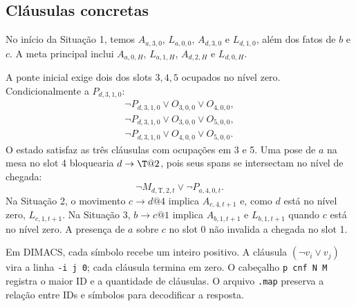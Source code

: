 \documentclass[11pt,a4paper]{article}
\newcommand{\T}{\mathrm{T}}
\begin{document}
\subsection{Cláusulas concretas}
No início da Situação 1, temos $A_{a,3,0}$, $L_{a,0,0}$, $A_{d,3,0}$ e $L_{d,1,0}$, além dos fatos de $b$ e $c$. A meta principal inclui $A_{a,0,H}$, $L_{a,1,H}$, $A_{d,2,H}$ e $L_{d,0,H}$.

A ponte inicial exige dois dos slots $3,4,5$ ocupados no nível zero. Condicionalmente a $P_{d,3,1,0}$:
\begin{gather*}
\neg P_{d,3,1,0}\lor O_{3,0,0}\lor O_{4,0,0},\\
\neg P_{d,3,1,0}\lor O_{3,0,0}\lor O_{5,0,0},\\
\neg P_{d,3,1,0}\lor O_{4,0,0}\lor O_{5,0,0}.
\end{gather*}
O estado satisfaz as três cláusulas com ocupações em 3 e 5. Uma pose de $a$ na mesa no slot 4 bloquearia $d\to\T@2$, pois seus spans se intersectam no nível de chegada:
\[
\neg M_{d,\T,2,t}\lor\neg P_{a,4,0,t}.
\]
Na Situação 2, o movimento $c\to d@4$ implica $A_{c,4,t+1}$ e, como $d$ está no nível zero, $L_{c,1,t+1}$. Na Situação 3, $b\to c@1$ implica $A_{b,1,t+1}$ e $L_{b,1,t+1}$ quando $c$ está no nível zero. A presença de $a$ sobre $c$ no slot 0 não invalida a chegada no slot 1.

Em DIMACS, cada símbolo recebe um inteiro positivo. A cláusula $(\neg v_i\lor v_j)$ vira a linha \texttt{-i j 0}; cada cláusula termina em zero. O cabeçalho \texttt{p cnf N M} registra o maior ID e a quantidade de cláusulas. O arquivo \texttt{.map} preserva a relação entre IDs e símbolos para decodificar a resposta.
\end{document}
